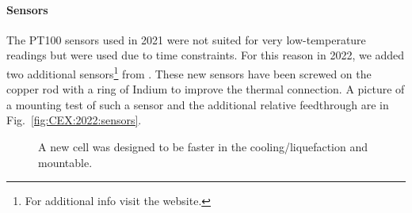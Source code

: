 \begin{refsection}
        \paragraph{Sensors} The PT100 sensors used in 2021 were not suited for very low-temperature readings but were used due to time constraints. 
        For this reason in 2022, we added two additional sensors\footnote{For additional info visit the \href{https://www.lakeshore.com/products/categories/overview/temperature-products/cryogenic-temperature-sensors/germanium}{\underline{\lakeshore}} website.} from \lakeshore.
        These new sensors have been screwed on the copper rod with a ring of Indium to improve the thermal connection. 
        A picture of a mounting test of such a sensor and the additional relative feedthrough are in Fig.~\ref{fig:CEX:2022:sensors}.

        \begin{figure}
            \centering
            \hfill
            \caption{A new cell was designed to be faster in the cooling/liquefaction and mountable.}
            \label{fig:CEX:2022:cell}
        \end{figure}
        

\end{refsection}
